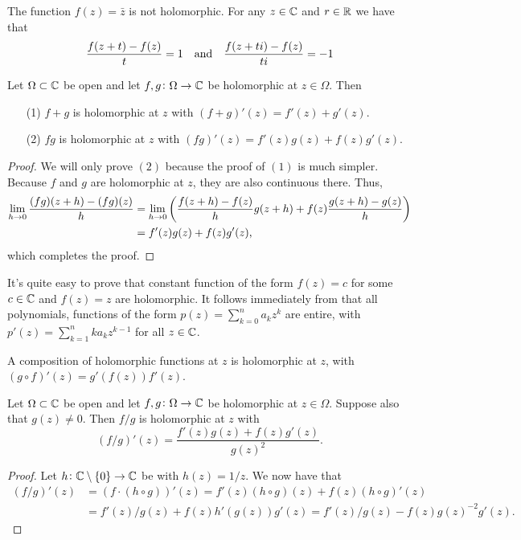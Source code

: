 \documentclass[11pt,a4paper]{article}
\begin{document}
\begin{example}
  The function $f(z) = \bar z$ is not holomorphic. For any $z \in \mathbb{C}$ and
  $r \in \mathbb{R}$ we have that
  \[
    \frac{f(z + t) - f(z)}{t} = 1 \quad \text{and} \quad
    \frac{f(z + t i) - f(z)}{t i} = -1
  \]
\end{example}

\begin{proposition}
  \label{prop:holo-is-linear}
  Let $\Omega \subset \mathbb{C}$ be open and let $f,g \colon \Omega \to \mathbb{C}$ be
  holomorphic at $z \in \Omega$. Then
  \begin{enumerate}
    \item[(1)] $f + g$ is holomorphic at $z$ with $(f + g)'(z) = f'(z) + g'(z)$.
    \item[(2)] $f g$ is holomorphic at $z$ with $(f g)'(z) = 
      f'(z)g(z) + f(z)g'(z)$.
  \end{enumerate}
\end{proposition}

\begin{proof}
  We will only prove $(2)$ because the proof of $(1)$ is much simpler.
  Because $f$ and $g$ are holomorphic at $z$, they are also continuous
  there. Thus,
  \begin{align*}
    \lim_{h \to 0} \frac{(f g)(z + h) - (f g)(z)}{h} &=
    \lim_{h \to 0} \del{\frac{f(z + h) - f(z)}{h} g(z + h) + 
  f(z) \frac{g(z + h) - g(z)}{h}} \\ &=
    f'(z)g(z) + f(z)g'(z),
  \end{align*}
  which completes the proof.
\end{proof}

\begin{corollary}
  It's quite easy to prove that constant function of the form $f(z) = c$
  for some $c \in \mathbb{C}$ and $f(z) = z$ are holomorphic.
  It follows immediately from  that all polynomials,
  functions of the form $p(z) = \sum_{k=0}^{n} a_k z^k$ are entire, with
  $p'(z) = \sum_{k=1}^{n} k a_k z^{k-1}$ for all $z \in \mathbb{C}$.
\end{corollary}

\begin{proposition}
  A composition of holomorphic functions at $z$ is holomorphic at $z$, with
  $(g \circ f)'(z) = g'(f(z)) f'(z)$.
\end{proposition}

\begin{corollary}
  Let $\Omega \subset \mathbb{C}$ be open and let $f,g \colon \Omega \to \mathbb{C}$ be
  holomorphic at $z \in \Omega$.
  Suppose also that $g(z) \neq 0$.
  Then $f/g$ is holomorphic at $z$ with
  \[
    (f/g)'(z) = \frac{f'(z)g(z) + f(z)g'(z)}{g(z)^2}.
  \]
\end{corollary}
\begin{proof}
  Let $h \colon \mathbb{C} \setminus \set{0} \to \mathbb{C}$ be with $h(z) = 1/z$.
  We now have that
  \begin{align*}
    (f/g)'(z) &=
    (f \cdot (h \circ g))'(z) =
    f'(z)(h \circ g)(z) + f(z)(h \circ g)'(z) \\ &=
    f'(z)/g(z) + f(z)h'(g(z))g'(z) =
    f'(z)/g(z) - f(z)g(z)^{-2}g'(z).
  \end{align*}
\end{proof}
\end{document}
